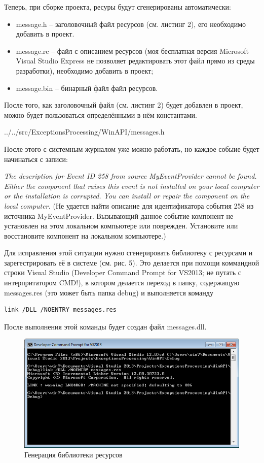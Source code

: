 \documentclass[a4paper, 12pt]{report}		%
\begin{document}
Теперь, при сборке проекта, ресуры будут сгенерированы автоматически:
\begin{itemize}
\item message.h -- заголовочный файл ресурсов (см. листинг 2), его необходимо добавить в проект.
\item message.rc -- файл с описанием ресурсов (моя бесплатная версия Microsoft Visual Studio Express не позволяет редактировать этот файл прямо из среды разработки), необходимо добавить в проект;
\item message.bin -- бинарный файл файл ресурсов.
\end{itemize}

После того, как заголовочный файл (см. листинг 2) будет добавлен в проект, можно будет пользоваться определёнными в нём константами.


{../../src/ExceptionsProcessing/WinAPI/messages.h}

После этого с системным журналом уже можно работать, но каждое собыие будет начинаться с записи:

\textit{The description for Event ID 258 from source MyEventProvider cannot be found. Either the component that raises this event is not installed on your local computer or the installation is corrupted. You can install or repair the component on the local computer.} (Не удается найти описание для идентификатора события 258 из источника MyEventProvider. Вызывающий данное событие компонент не установлен на этом локальном компьютере или поврежден. Установите или восстановите компонент на локальном компьютере.)

Для исправления этой ситуации нужно сгенерировать библиотеку с ресурсами и зарегестрировать её в системе (см. рис. 5). Это делается при помощи коммандной строки Visual Studio (Developer Command Prompt for VS2013; не путать с интерпритатором CMD!), в котором делается переход в папку, содержащую messages.res (это может быть папка debug) и выполняется команду
\begin{verbatim}
link /DLL /NOENTRY messages.res
\end{verbatim}

После выполнения этой команды будет создан файл messages.dll.

\begin{figure}[h!]
\centering
\includegraphics[scale=0.9]{res/res}
\caption{Генерация библиотеки ресурсов}
\end{figure}
\end{document}
